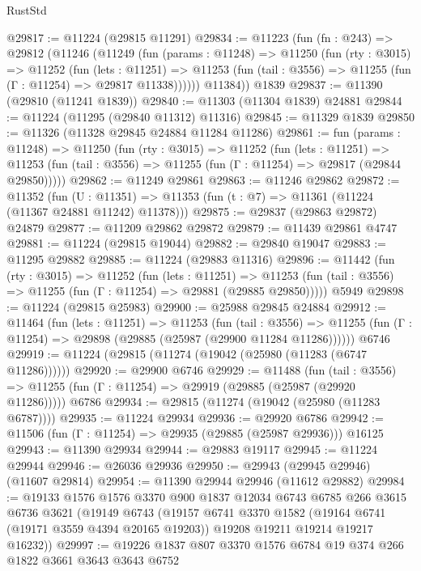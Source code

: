 \begin{lexlean}{RustStd}
\begin{coremodule}
@29817 := @11224 (@29815 @11291)
@29834 := @11223
    (fun (fn : @243) =>
    @29812
      (@11246
        (@11249
          (fun (params : @11248) =>
          @11250
            (fun (rty : @3015) =>
            @11252
              (fun (lets : @11251) =>
              @11253 (fun (tail : @3556) => @11255 (fun (Γ : @11254) => @29817 @11338))))))
        @11384))
    @1839
@29837 := @11390 (@29810 (@11241 @1839))
@29840 := @11303 (@11304 @1839) @24881
@29844 := @11224 (@11295 (@29840 @11312) @11316)
@29845 := @11329 @1839
@29850 := @11326 (@11328 @29845 @24884 @11284 @11286)
@29861 := fun (params : @11248) =>
  @11250
    (fun (rty : @3015) =>
    @11252
      (fun (lets : @11251) =>
      @11253 (fun (tail : @3556) => @11255 (fun (Γ : @11254) => @29817 (@29844 @29850)))))
@29862 := @11249 @29861
@29863 := @11246 @29862
@29872 := @11352
    (fun (U : @11351) => @11353 (fun (t : @7) => @11361 (@11224 (@11367 @24881 @11242) @11378)))
@29875 := @29837 (@29863 @29872) @24879
@29877 := @11209 @29862 @29872
@29879 := @11439 @29861 @4747
@29881 := @11224 (@29815 @19044)
@29882 := @29840 @19047
@29883 := @11295 @29882
@29885 := @11224 (@29883 @11316)
@29896 := @11442
    (fun (rty : @3015) =>
    @11252
      (fun (lets : @11251) =>
      @11253 (fun (tail : @3556) => @11255 (fun (Γ : @11254) => @29881 (@29885 @29850)))))
    @5949
@29898 := @11224 (@29815 @25983)
@29900 := @25988 @29845 @24884
@29912 := @11464
    (fun (lets : @11251) =>
    @11253
      (fun (tail : @3556) =>
      @11255 (fun (Γ : @11254) => @29898 (@29885 (@25987 (@29900 @11284 @11286))))))
    @6746
@29919 := @11224 (@29815 (@11274 (@19042 (@25980 (@11283 (@6747 @11286))))))
@29920 := @29900 @6746
@29929 := @11488
    (fun (tail : @3556) => @11255 (fun (Γ : @11254) => @29919 (@29885 (@25987 (@29920 @11286)))))
    @6786
@29934 := @29815 (@11274 (@19042 (@25980 (@11283 @6787))))
@29935 := @11224 @29934
@29936 := @29920 @6786
@29942 := @11506 (fun (Γ : @11254) => @29935 (@29885 (@25987 @29936))) @16125
@29943 := @11390 @29934
@29944 := @29883 @19117
@29945 := @11224 @29944
@29946 := @26036 @29936
@29950 := @29943 (@29945 @29946) (@11607 @29814)
@29954 := @11390 @29944 @29946 (@11612 @29882)
@29984 := @19133
    @1576
    @1576
    @3370
    @900
    @1837
    @12034
    @6743
    @6785
    @266
    @3615
    @6736
    @3621
    (@19149
      @6743
      (@19157
        @6741
        @3370
        @1582
        (@19164 @6741 (@19171 @3559 @4394 @20165 @19203))
        @19208
        @19211
        @19214
        @19217
        @16232))
@29997 := @19226 @1837 @807 @3370 @1576 @6784 @19 @374 @266 @1822 @3661 @3643 @3643 @6752

\end{coremodule}
\end{lexlean}
